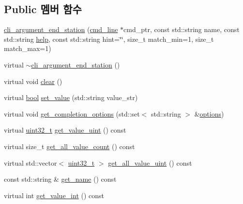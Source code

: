 \subsection*{Public 멤버 함수}
\begin{DoxyCompactItemize}
\item 
\hyperlink{classcli__argument__end__station_ab13b16903a28b47ca0daeaf6c3192a02}{cli\+\_\+argument\+\_\+end\+\_\+station} (\hyperlink{classcmd__line}{cmd\+\_\+line} $\ast$cmd\+\_\+ptr, const std\+::string name, const std\+::string \hyperlink{simple__rx_8c_ad8c51bbfda76f19f61c727838e6eee30}{help}, const std\+::string hint=\char`\"{}\char`\"{}, size\+\_\+t match\+\_\+min=1, size\+\_\+t match\+\_\+max=1)
\item 
virtual \hyperlink{classcli__argument__end__station_a8e52228af69e0f0e3cacc43ce36fa13d}{$\sim$cli\+\_\+argument\+\_\+end\+\_\+station} ()
\item 
virtual void \hyperlink{classcli__argument__end__station_ac8bb3912a3ce86b15842e79d0b421204}{clear} ()
\item 
virtual \hyperlink{avb__gptp_8h_af6a258d8f3ee5206d682d799316314b1}{bool} \hyperlink{classcli__argument__end__station_aa768ad337cc685b348672423139875a4}{set\+\_\+value} (std\+::string value\+\_\+str)
\item 
virtual void \hyperlink{classcli__argument__end__station_a352166cf0e4c52574c7ca484bbcc44ed}{get\+\_\+completion\+\_\+options} (std\+::set$<$ std\+::string $>$ \&\hyperlink{aaf-talker_8c_abc1fd3a47aea6a8944038c9100eb9135}{options})
\item 
virtual \hyperlink{parse_8c_a6eb1e68cc391dd753bc8ce896dbb8315}{uint32\+\_\+t} \hyperlink{classcli__argument__end__station_a5f9326ccc460c0477c9ec2a3c6fe8e2b}{get\+\_\+value\+\_\+uint} () const 
\item 
virtual size\+\_\+t \hyperlink{classcli__argument__end__station_ac6f27f29a2c1249e0c49cc9064ee75ad}{get\+\_\+all\+\_\+value\+\_\+count} () const 
\item 
virtual std\+::vector$<$ \hyperlink{parse_8c_a6eb1e68cc391dd753bc8ce896dbb8315}{uint32\+\_\+t} $>$ \hyperlink{classcli__argument__end__station_a2636ddb80a5e6d770a9928181926cfe2}{get\+\_\+all\+\_\+value\+\_\+uint} () const 
\item 
const std\+::string \& \hyperlink{classcli__argument_a5d21f54a56044f0fd7b2d9bb0474ba33}{get\+\_\+name} () const 
\item 
virtual int \hyperlink{classcli__argument_a70de7682629678e3139c0511910036c1}{get\+\_\+value\+\_\+int} () const 
\item 

\end{DoxyCompactItemize}
